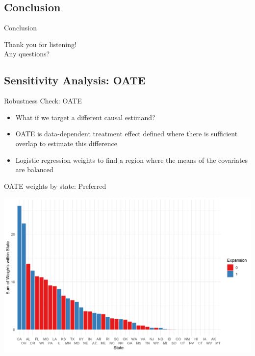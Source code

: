 \documentclass[hyperref={pdfpagelabels=false}]{beamer}
\newcommand{\backupbegin}{
   \newcounter{finalframe}
   \setcounter{finalframe}{\value{framenumber}}
}
\begin{document}
\subsection{Conclusion}
\begin{frame}{Conclusion}
\begin{center}
Thank you for listening! \\ 
\newline Any questions?
\end{center}
\end{frame}

\backupbegin

\subsection{Sensitivity Analysis: OATE}

\begin{frame}{Robustness Check: OATE}
    \begin{itemize}
        \item What if we target a different causal estimand? \bigskip
        \item OATE is data-dependent treatment effect defined where there is sufficient overlap to estimate this difference \bigskip
        \item Logistic regression weights to find a region where the means of the covariates are balanced \bigskip
    \end{itemize}
\end{frame}

\begin{frame}{OATE weights by state: Preferred}
    \begin{center}
	\includegraphics[scale=0.5]{01_Plots/oate-region-c1-a.png}
    \end{center}
\end{frame}
\end{document}
